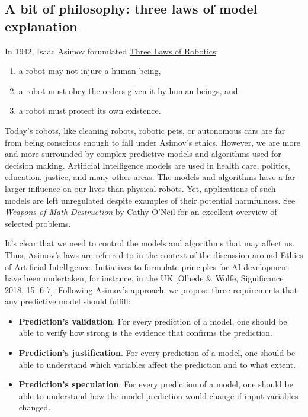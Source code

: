 \documentclass[12pt,]{krantz}
\providecommand{\tightlist}{%
  \setlength{\itemsep}{0pt}\setlength{\parskip}{0pt}}
\begin{document}
\hypertarget{three-single-laws}{%
\subsection{A bit of philosophy: three laws of model explanation}\label{three-single-laws}}

In 1942, Isaac Asimov forumlated \href{https://en.wikipedia.org/wiki/Three_Laws_of_Robotics}{Three Laws of Robotics}:

\begin{enumerate}
\def\labelenumi{\arabic{enumi})}
\tightlist
\item
  a robot may not injure a human being,
\item
  a robot must obey the orders given it by human beings, and
\item
  a robot must protect its own existence.
\end{enumerate}

Today's robots, like cleaning robots, robotic pets, or autonomous cars are far from being conscious enough to fall under Asimov's ethics. However, we are more and more surrounded by complex predictive models and algorithms used for decision making. Artificial Intelligence models are used in health care, politics, education, justice, and many other areas. The models and algorithms have a far larger influence on our lives than physical robots. Yet, applications of such models are left unregulated despite examples of their potential harmfulness. See \emph{Weapons of Math Destruction} by Cathy O'Neil \citep{ONeil} for an excellent overview of selected problems.

It's clear that we need to control the models and algorithms that may affect us. Thus, Asimov's laws are referred to in the context of the discussion around \href{https://en.wikipedia.org/wiki/Ethics_of_artificial_intelligence}{Ethics of Artificial Intelligence}. Initiatives to formulate principles for AI development have been undertaken, for instance, in the UK {[}Olhede \& Wolfe, Significance 2018, 15: 6-7{]}. Following Asimov's approach, we propose three requirements that any predictive model should fulfill:

\begin{itemize}
\tightlist
\item
  \textbf{Prediction's validation}. For every prediction of a model, one should be able to verify how strong is the evidence that confirms the prediction.
\item
  \textbf{Prediction's justification}. For every prediction of a model, one should be able to understand which variables affect the prediction and to what extent.
\item
  \textbf{Prediction's speculation}. For every prediction of a model, one should be able to understand how the model prediction would change if input variables changed.
\end{itemize}
\end{document}

